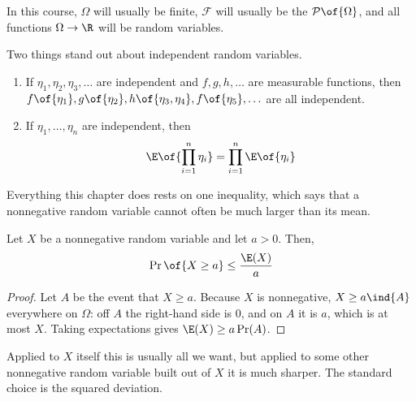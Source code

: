 In this course, $\Omega$ will usually be finite, $\mathcal{F}$ will usually be the $\mathcal{P}\of{\Omega}$, and all functions $\Omega \to \R$ will be random variables.

Two things stand out about independent random variables.

\begin{enumerate}
    \item If $\eta_1, \eta_2, \eta_3, \ldots$ are independent and $f, g, h, \ldots$ are measurable functions, then $f\of{\eta_1}, g\of{\eta_2}, h\of{\eta_3, \eta_4}, f\of{\eta_5}, \ldots$ are all independent.

    \item If $\eta_1, \ldots, \eta_n$ are independent, then
    \begin{align*}
        \E\of{\prod_{i=1}^{n} \eta_i} = \prod_{i=1}^{n} \E\of{\eta_i}
    \end{align*}
\end{enumerate}

Everything this chapter does rests on one inequality, which says that a nonnegative random variable cannot often be much larger than its mean.

\begin{boxtheorem} \label{Ch3:Thm:Markov}
    Let $X$ be a nonnegative random variable and let $a > 0$. Then,
    \begin{align*}
        \Pr\of{X \geq a} \leq \frac{\E(X)}{a}
    \end{align*}
\end{boxtheorem}
\begin{proof}
    Let $A$ be the event that $X \geq a$. Because $X$ is nonnegative, $X \geq a \ind{A}$ everywhere on $\Omega$: off $A$ the right-hand side is $0$, and on $A$ it is $a$, which is at most $X$. Taking expectations gives $\E(X) \geq a \Pr(A)$.
\end{proof}

Applied to $X$ itself this is usually all we want, but applied to some other nonnegative random variable built out of $X$ it is much sharper. The standard choice is the squared deviation.

